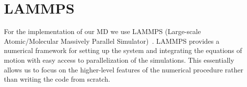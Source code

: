 












\section{LAMMPS}\label{sec:LAMMPS}
For the implementation of our \acrshort{MD} we use LAMMPS (Large-scale Atomic/Molecular Massively Parallel Simulator)~\cite{LAMMPS}. LAMMPS provides a numerical framework for setting up the system and integrating the equations of motion with easy access to parallelization of the simulations. This essentially allows us to focus on the higher-level features of the numerical procedure rather than writing the code from scratch. 